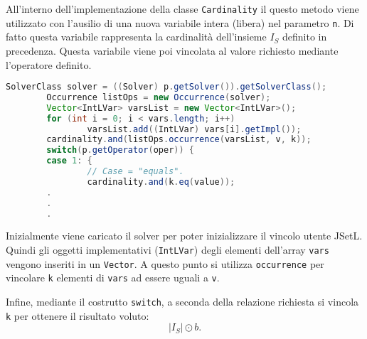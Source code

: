 All'interno dell'implementazione della classe \texttt{Cardinality} il
questo metodo   viene utilizzato con l'ausilio di una nuova
variabile intera (libera) nel parametro \texttt{n}. Di fatto questa variabile
rappresenta la cardinalità dell'insieme $I_S$ definito in precedenza.
Questa variabile viene poi vincolata al valore richiesto mediante
l'operatore definito.

\begin{lstlisting}[language=Java,
                   caption = {\texttt{Occurrence} usato in 
\texttt{cardinality}}]
        SolverClass solver = ((Solver) p.getSolver()).getSolverClass();
        Occurrence listOps = new Occurrence(solver);
        Vector<IntLVar> varsList = new Vector<IntLVar>();
        for (int i = 0; i < vars.length; i++)
                varsList.add((IntLVar) vars[i].getImpl());
        cardinality.and(listOps.occurrence(varsList, v, k));
        switch(p.getOperator(oper)) {
        case 1: {
                // Case = "equals". 
                cardinality.and(k.eq(value));
        .
        .
        .
\end{lstlisting}
Inizialmente viene caricato il solver per poter inizializzare il vincolo
utente JSetL. Quindi gli oggetti implementativi (\texttt{IntLVar}) degli
elementi dell'array \texttt{vars} vengono inseriti in un \texttt{Vector}. A
questo punto si utilizza \texttt{occurrence} per vincolare \texttt{k} elementi
di \texttt{vars} ad essere uguali a \texttt{v}.

Infine, mediante il costrutto \texttt{switch}, a seconda della relazione
richiesta si vincola \texttt{k} per ottenere il risultato voluto:
\[
|I_S| \odot b.
\]
